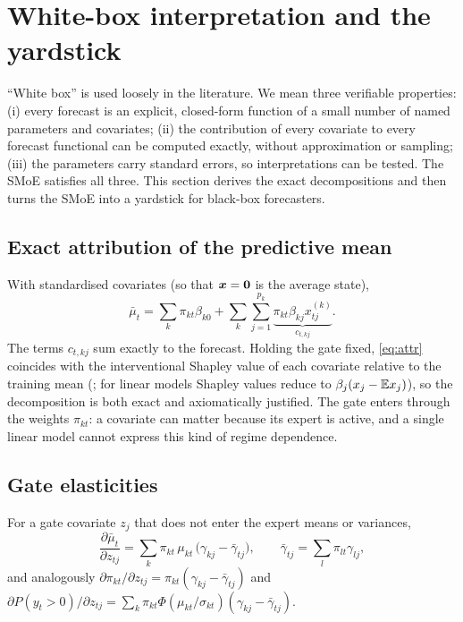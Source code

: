 \section{White-box interpretation and the yardstick}\label{sec:whitebox}

``White box'' is used loosely in the literature. We mean three verifiable properties:
(i) every forecast is an explicit, closed-form function of a small number of named parameters and
covariates; (ii) the contribution of every covariate to every forecast functional can be computed
exactly, without approximation or sampling; (iii) the parameters carry standard errors, so
interpretations can be tested. The SMoE satisfies all three. This section derives the exact
decompositions and then turns the SMoE into a yardstick for black-box forecasters.

\subsection{Exact attribution of the predictive mean}

With standardised covariates (so that $\bm{x}=\bm 0$ is the average state),
\begin{equation}\label{eq:attr}
  \bar\mu_t=\sum_k\pi_{kt}\beta_{k0}+\sum_k\sum_{j=1}^{p_k}\underbrace{\pi_{kt}\beta_{kj}x^{(k)}_{tj}}_{c_{t,kj}} .
\end{equation}
The terms $c_{t,kj}$ sum exactly to the forecast. Holding the gate fixed, \eqref{eq:attr} coincides
with the interventional Shapley value of each covariate relative to the training mean
(\citealp{lundberg2017unified}; for linear models Shapley values reduce to
$\beta_j(x_j-\mathbb{E} x_j)$), so the decomposition is both exact and axiomatically justified. The gate
enters through the weights $\pi_{kt}$: a covariate can matter because its expert is active, and a
single linear model cannot express this kind of regime dependence.

\subsection{Gate elasticities}

\begin{proposition}\label{prop:elasticity}
For a gate covariate $z_j$ that does not enter the expert means or variances,
\begin{equation}\label{eq:elast}
  \frac{\partial\bar\mu_t}{\partial z_{tj}}=\sum_k\pi_{kt}\,\mu_{kt}\,\big(\gamma_{kj}-\bar\gamma_{tj}\big),\qquad
  \bar\gamma_{tj}=\sum_l\pi_{lt}\gamma_{lj},
\end{equation}
and analogously
$\partial\pi_{kt}/\partial z_{tj}=\pi_{kt}(\gamma_{kj}-\bar\gamma_{tj})$ and
$\partial P(y_t>0)/\partial z_{tj}=\sum_k\pi_{kt}\Phi(\mu_{kt}/\sigma_{kt})(\gamma_{kj}-\bar\gamma_{tj})$.
\end{proposition}

